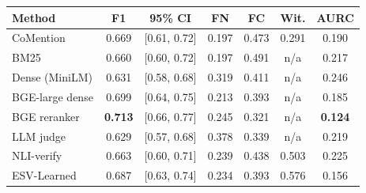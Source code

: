 \setlength{\tabcolsep}{3pt}
\begin{tabular}{lcccccc}
\toprule
Method & F1 & 95\% CI & FN & FC & Wit. & AURC \\
\midrule
CoMention & 0.669 & [0.61, 0.72] & 0.197 & 0.473 & 0.291 & 0.190 \\
BM25 & 0.660 & [0.60, 0.72] & 0.197 & 0.491 & n/a & 0.217 \\
Dense (MiniLM) & 0.631 & [0.58, 0.68] & 0.319 & 0.411 & n/a & 0.246 \\
BGE-large dense & 0.699 & [0.64, 0.75] & 0.213 & 0.393 & n/a & 0.185 \\
BGE reranker & \textbf{0.713} & [0.66, 0.77] & 0.245 & 0.321 & n/a & \textbf{0.124} \\
LLM judge & 0.629 & [0.57, 0.68] & 0.378 & 0.339 & n/a & 0.219 \\
NLI-verify & 0.663 & [0.60, 0.71] & 0.239 & 0.438 & 0.503 & 0.225 \\
ESV-Learned & 0.687 & [0.63, 0.74] & 0.234 & 0.393 & 0.576 & 0.156 \\
\bottomrule
\end{tabular}

